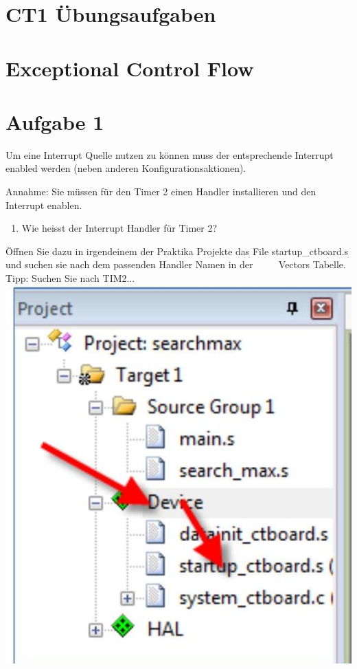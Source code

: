 \documentclass[10pt]{article}
\begin{document}
\section*{CT1 Übungsaufgaben}
\section*{Exceptional Control Flow}
\section*{Aufgabe 1}
Um eine Interrupt Quelle nutzen zu können muss der entsprechende Interrupt enabled werden (neben anderen Konfigurationsaktionen).

Annahme: Sie müssen für den Timer 2 einen Handler installieren und den Interrupt enablen.

\begin{enumerate}
  \item Wie heisst der Interrupt Handler für Timer 2?
\end{enumerate}

Öffnen Sie dazu in irgendeinem der Praktika Projekte das File startup\_ctboard.s und suchen sie nach dem passenden Handler Namen in der $\qquad$ Vectors Tabelle.\\
Tipp: Suchen Sie nach TIM2...\\
\includegraphics[max width=\textwidth, center]{2025_01_02_1e89fec346403e1ae751g-1}
\end{document}

